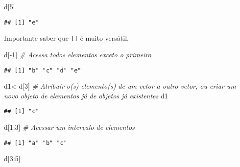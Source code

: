 \documentclass[
]{book}
\newenvironment{Shaded}{\begin{snugshade}}{\end{snugshade}}
\newcommand{\CommentTok}[1]{\textcolor[rgb]{0.56,0.35,0.01}{\textit{#1}}}
\newcommand{\DecValTok}[1]{\textcolor[rgb]{0.00,0.00,0.81}{#1}}
\newcommand{\NormalTok}[1]{#1}
\newcommand{\OtherTok}[1]{\textcolor[rgb]{0.56,0.35,0.01}{#1}}
\newcommand{\SpecialCharTok}[1]{\textcolor[rgb]{0.00,0.00,0.00}{#1}}
\begin{document}
\begin{Shaded}
\begin{Highlighting}[]
\NormalTok{d[}\DecValTok{5}\NormalTok{]}
\end{Highlighting}
\end{Shaded}

\begin{verbatim}
## [1] "e"
\end{verbatim}

Importante saber que \texttt{{[}{]}} é muito versátil.

\begin{Shaded}
\begin{Highlighting}[]
\NormalTok{d[}\SpecialCharTok{{-}}\DecValTok{1}\NormalTok{] }\CommentTok{\# Acessa todos elementos exceto o primeiro}
\end{Highlighting}
\end{Shaded}

\begin{verbatim}
## [1] "b" "c" "d" "e"
\end{verbatim}

\begin{Shaded}
\begin{Highlighting}[]
\NormalTok{d1}\OtherTok{\textless{}{-}}\NormalTok{d[}\DecValTok{3}\NormalTok{] }\CommentTok{\# Atribuir o(s) elemento(s) de um vetor a outro vetor, ou criar um novo objeto de elementos já de objetos já existentes}
\NormalTok{d1}
\end{Highlighting}
\end{Shaded}

\begin{verbatim}
## [1] "c"
\end{verbatim}

\begin{Shaded}
\begin{Highlighting}[]
\NormalTok{d[}\DecValTok{1}\SpecialCharTok{:}\DecValTok{3}\NormalTok{] }\CommentTok{\# Acessar um intervalo de elementos}
\end{Highlighting}
\end{Shaded}

\begin{verbatim}
## [1] "a" "b" "c"
\end{verbatim}

\begin{Shaded}
\begin{Highlighting}[]
\NormalTok{d[}\DecValTok{3}\SpecialCharTok{:}\DecValTok{5}\NormalTok{]}
\end{Highlighting}
\end{Shaded}
\end{document}
